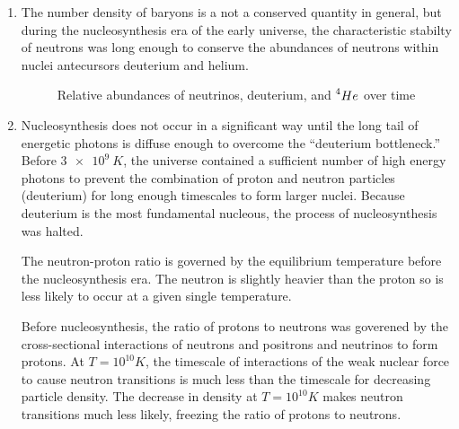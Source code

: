 \documentclass{paper}
\begin{document}
\begin{enumerate}
    \item %
      The number density of baryons is a not a conserved quantity in general, 
      but during the nucleosynthesis era of the early universe, the 
      characteristic stabilty of neutrons was long enough to conserve the
      abundances of neutrons within nuclei antecursors deuterium and helium.
      \begin{figure}[!hbt]
        \label{fig:mass-fractions}
        \caption{Relative abundances of neutrinos, deuterium, and 
          \(\prescript{4}{}{He}\) over time}
      \end{figure}

    \item %
      Nucleosynthesis does not occur in a significant way until the long tail
      of energetic photons is diffuse enough to overcome the ``deuterium
      bottleneck.'' Before \(\SI{3e9}{K}\), the universe contained a 
      sufficient number of high energy photons to prevent the combination of
      proton and neutron particles (deuterium) for long enough timescales to
      form larger nuclei. Because deuterium is the most fundamental nucleous,
      the process of nucleosynthesis was halted.

      The neutron-proton ratio is governed by the equilibrium temperature 
      before the nucleosynthesis era. The neutron is slightly heavier than the 
      proton so is less likely to occur at a given single temperature.

      Before nucleosynthesis, the ratio of protons to neutrons was goverened
      by the cross-sectional interactions of neutrons and positrons and
      neutrinos to form protons. At \(T=10^{10}\si{K}\), the timescale of
      interactions of the weak nuclear force to cause neutron transitions is
      much less than the timescale for decreasing particle density. The
      decrease in density at \(T=10^{10}\si{K}\) makes neutron transitions 
      much less likely, freezing the ratio of protons to neutrons.


\end{enumerate}
\end{document}
